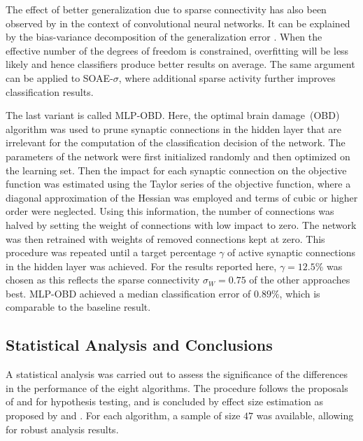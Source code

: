 \documentclass[twoside,11pt]{article}
\newcommand{\0}{\mathcal{O}}
\begin{document}
The effect of better generalization due to sparse connectivity has also been observed by \citet{LeCun1990} in the context of convolutional neural networks.
It can be explained by the bias-variance decomposition of the generalization error \citep{Geman1992}.
When the effective number of the degrees of freedom is constrained, overfitting will be less likely and hence classifiers produce better results on average.
The same argument can be applied to SOAE-$\sigma$, where additional sparse activity further improves classification results.

The last variant is called MLP-OBD.
Here, the optimal brain damage~(OBD) algorithm \citep{LeCun1990} was used to prune synaptic connections in the hidden layer that are irrelevant for the computation of the classification decision of the network.
The parameters of the network were first initialized randomly and then optimized on the learning set.
Then the impact for each synaptic connection on the objective function was estimated using the Taylor series of the objective function, where a diagonal approximation of the Hessian was employed and terms of cubic or higher order were neglected.
Using this information, the number of connections was halved by setting the weight of connections with low impact to zero.
The network was then retrained with weights of removed connections kept at zero.
This procedure was repeated until a target percentage $\gamma$ of active synaptic connections in the hidden layer was achieved.
For the results reported here, $\gamma = 12.5\%$ was chosen as this reflects the sparse connectivity $\sigma_W = 0.75$ of the other approaches best.
MLP-OBD achieved a median classification error of $0.89\%$, which is comparable to the baseline result.

\subsection{Statistical Analysis and Conclusions}
\label{sect:statistical_analysis}
A statistical analysis was carried out to assess the significance of the differences in the performance of the eight algorithms.
The procedure follows the proposals of \citet{Pizarro2002} and \citet{Demsar2006} for hypothesis testing, and is concluded by effect size estimation as proposed by \citet{Grissom1994} and \citet{Acion2006}.
For each algorithm, a sample of size $47$ was available, allowing for robust analysis results.
\end{document}
